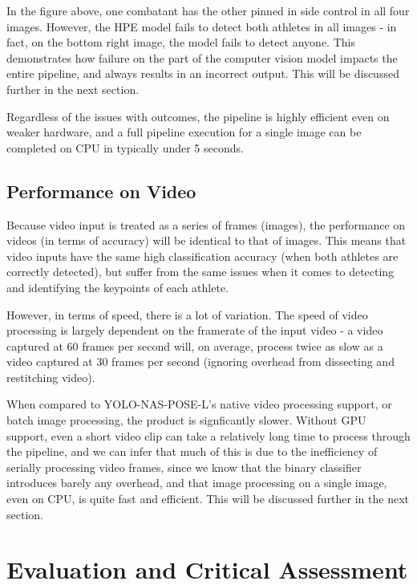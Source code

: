 \documentclass[a4paper, oneside, 11pt]{article}
\begin{document}
\bigskip
\noindent
In the figure above, one combatant has the other pinned in side control in all four images. However, the HPE model fails to detect both athletes in all images - in fact, on the bottom right image, the model fails to detect anyone. This demonstrates how failure on the part of the computer vision model impacts the entire pipeline, and always results in an incorrect output. This will be discussed further in the next section. 

\bigskip
\noindent
Regardless of the issues with outcomes, the pipeline is highly efficient even on weaker hardware, and a full pipeline execution for a single image can be completed on CPU in typically under 5 seconds.

\subsection{Performance on Video}

\noindent
Because video input is treated as a series of frames (images), the performance on videos (in terms of accuracy) will be identical to that of images. This means that video inputs have the same high classification accuracy (when both athletes are correctly detected), but suffer from the same issues when it comes to detecting and identifying the keypoints of each athlete.

\bigskip
\noindent
However, in terms of speed, there is a lot of variation. The speed of video processing is largely dependent on the framerate of the input video - a video captured at 60 frames per second will, on average, process twice as slow as a video captured at 30 frames per second (ignoring overhead from dissecting and restitching video).

\bigskip
\noindent
When compared to YOLO-NAS-POSE-L's native video processing support, or batch image processing, the product is signficantly slower. Without GPU support, even a short video clip can take a relatively long time to process through the pipeline, and we can infer that much of this is due to the inefficiency of serially processing video frames, since we know that the binary classifier introduces barely any overhead, and that image processing on a single image, even on CPU, is quite fast and efficient. This will be discussed further in the next section.

\section{Evaluation and Critical Assessment}
\end{document}
